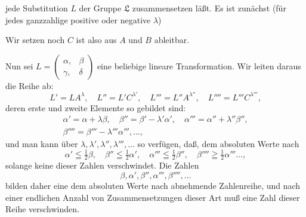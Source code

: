jede Substitution $L$ der Gruppe $\mathfrak{L}$ zusammensetzen läßt. Es ist
zunächst
(für jedes ganzzahlige positive oder negative $\lambda$)

Wir setzen noch
$C$ ist also aus $A$ und $B$ ableitbar.

Nun sei $L = \begin{pmatrix}\alpha, & \beta\\\gamma, & \delta\end{pmatrix}$ eine beliebige lineare Transformation.
Wir leiten daraus die Reihe ab:
\[
L' = LA^\lambda, \quad L'' = L'C^{\lambda'}, \quad L''' = L''A^{\lambda''}, \quad L'''' = L'''C^{\lambda'''},
\]
deren erste und zweite Elemente so gebildet sind:
\[
\begin{gathered}
\alpha' = \alpha + \lambda\beta, \quad \beta'' = \beta' - \lambda'\alpha', \quad \alpha''' = \alpha'' + \lambda''\beta'',\\
\beta'''' = \beta''' - \lambda'''\alpha''', \dots,
\end{gathered}
\]
und man kann über $\lambda, \lambda', \lambda'', \lambda''', \dots$ so verfügen, daß, dem
absoluten Werte nach
\[
\alpha' \leqq \tfrac{1}{2}\beta, \quad \beta'' \leqq \tfrac{1}{2}\alpha', \quad \alpha''' \leqq \tfrac{1}{2}\beta'', \quad \beta'''' \geqq \tfrac{1}{2}\alpha''' \dots, %
\]
solange keine dieser Zahlen verschwindet. Die Zahlen
\[
\beta, \alpha', \beta'', \alpha''', \beta'''', \dots
\]
bilden daher eine dem absoluten Werte nach abnehmende Zahlenreihe, und nach einer endlichen Anzahl von Zusammensetzungen
dieser Art muß eine Zahl dieser Reihe verschwinden.

